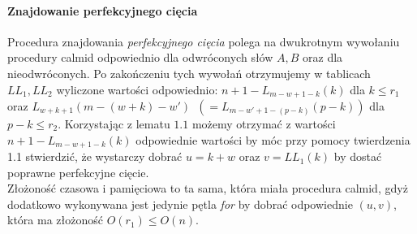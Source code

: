 \paragraph{Znajdowanie perfekcyjnego cięcia}
Procedura znajdowania \textit{perfekcyjnego cięcia} polega na dwukrotnym wywołaniu procedury calmid odpowiednio dla odwróconych słów $A, B$ oraz dla nieodwróconych. Po zakończeniu tych wywołań otrzymujemy w tablicach $LL_1, LL_2$ wyliczone wartości odpowiednio: $n + 1 - L_{m-w+1-k}(k)$ dla $k \leq r_1$ oraz $L_{w+k+1}(m-(w+k)-w')$\ $(= L_{m-w'+1-(p-k)}(p-k))$ dla $p-k \leq r_2$. Korzystając z lematu $1.1$ możemy otrzymać z wartości $n + 1 - L_{m-w+1-k}(k)$ odpowiednie wartości by móc przy pomocy twierdzenia 1.1 stwierdzić, że wystarczy dobrać $u = k + w$ oraz $v = LL_1(k)$ by dostać poprawne perfekcyjne cięcie.\\
Złożoność czasowa i pamięciowa to ta sama, która miała procedura calmid, gdyż dodatkowo wykonywana jest jedynie pętla \textit{for} by dobrać odpowiednie $(u, v)$, która ma złożoność $O(r_1) \leq O(n)$.
